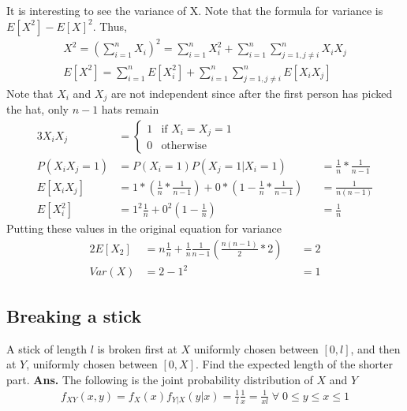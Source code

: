 \documentclass[11pt, a4paper]{article}
\begin{document}
    It is interesting to see the variance of X. Note that the formula for variance is $E[X^{2}] - E[X]^{2}$. Thus,
    \begin{align*}
        X^{2} = (\sum_{i=1}^{n} X_{i})^{2} = \sum_{i=1}^{n} X_{i}^{2} + \sum_{i=1}^{n} \sum_{j=1, j\neq i}^{n} X_{i}X{_j} \\
        E[X^{2}] = \sum_{i=1}^{n}E[X_{i}^{2}] + \sum_{i=1}^{n} \sum_{j=1, j\neq i}^{n} E[X_{i}X{_j}] 
    \end{align*}
    Note that $X_{i}$ and $X_{j}$ are not independent since after the first person has picked the hat, only $n-1$ hats remain
    \begin{alignat*}{3}
        X_{i}X_{j} &= \begin{cases} 1 &\mbox{if $X_{i} = X_{j} = 1$}\\
                                   0 &\mbox{otherwise} \end{cases} \\
        P(X_{i}X_{j} = 1) &= P(X_{i} = 1) P(X_{j} = 1|X_{i} = 1) &&= \frac{1}{n} * \frac{1}{n-1}\\
        E[X_{i}X_{j}] &= 1 * (\frac{1}{n} * \frac{1}{n-1}) + 0 * (1 - \frac{1}{n} * \frac{1}{n-1}) &&= \frac{1}{n(n-1)}\\
        E[X_{i}^2] &= 1^{2} \frac{1}{n} + 0^{2} (1-\frac{1}{n}) &&= \frac{1}{n}
    \end{alignat*}
    Putting these values in the original equation for variance
    \begin{alignat*}{2}
        E[X_{2}] &= n \frac{1}{n} + \frac{1}{n} \frac{1}{n-1} (\frac{n(n-1)}{2} * 2) &&= 2\\
        Var(X) &= 2 - 1^{2} &&= 1
    \end{alignat*}

    \subsection{Breaking a stick}
    A stick of length $l$ is broken first at $X$ uniformly chosen between $[0,l]$, and then at $Y$, uniformly chosen between $[0,X]$. Find the expected length of the shorter part.\newline \newline
    \textbf{Ans.} The following is the joint probability distribution of $X$ and $Y$
    \begin{align*}
        f_{XY}(x, y) = f_{X}(x) f_{Y|X}(y|x) = \frac{1}{l} \frac{1}{x} = \frac{1}{xl} \;\forall\; 0 \leq y \leq x \leq 1
    \end{align*}
    
\end{document}
